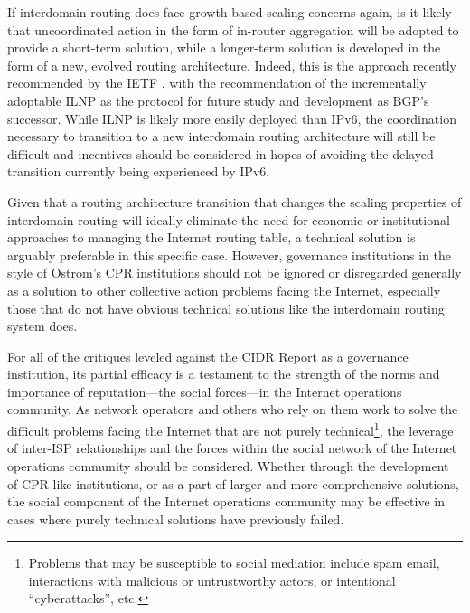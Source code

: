 If interdomain routing does face growth-based scaling concerns again, is it
likely that uncoordinated action in the form of in-router aggregation will be
adopted to provide a short-term solution, while a longer-term solution is
developed in the form of a new, evolved routing architecture. Indeed, this is
the approach recently recommended by the IETF \cite{rfc6115}, with the
recommendation of the incrementally adoptable ILNP as the protocol for future
study and development as BGP's successor. While ILNP is likely more easily
deployed than IPv6, the coordination necessary to transition to a new
interdomain routing architecture will still be difficult and incentives should
be considered in hopes of avoiding the delayed transition currently being
experienced by IPv6.

Given that a routing architecture transition that changes the scaling
properties of interdomain routing will ideally eliminate the need for economic
or institutional approaches to managing the Internet routing table, a technical
solution is arguably preferable in this specific case.  However, governance
institutions in the style of Ostrom's CPR institutions should not be ignored or
disregarded generally as a solution to other collective action problems facing
the Internet, especially those that do not have obvious technical solutions
like the interdomain routing system does.

For all of the critiques leveled against the CIDR Report as a governance
institution, its partial efficacy is a testament to the strength of the norms
and importance of reputation---the social forces---in the Internet operations
community. As network operators and others who rely on them work to solve the
difficult problems facing the Internet that are not purely
technical\footnote{Problems that may be susceptible to social mediation include
spam email, interactions with malicious or untrustworthy actors, or intentional
``cyberattacks'', etc.}, the leverage of inter-ISP relationships and the forces
within the social network of the Internet operations community should be
considered. Whether through the development of CPR-like institutions, or as a
part of larger and more comprehensive solutions, the social component of the
Internet operations community may be effective in cases where purely technical
solutions have previously failed.


